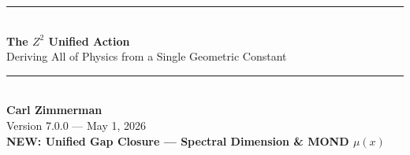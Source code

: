 \documentclass[11pt,a4paper]{article}
\theoremstyle{plain}
\theoremstyle{definition}
\theoremstyle{remark}
\begin{document}

\begin{center}
\rule{\textwidth}{1.5pt}\\[0.5cm]
{\LARGE\bfseries The $Z^2$ Unified Action}\\[0.3cm]
{\Large Deriving All of Physics from a Single Geometric Constant}\\[0.5cm]
\rule{\textwidth}{1.5pt}\\[0.8cm]

{\large\bfseries Carl Zimmerman}\\[0.3cm]
Version 7.0.0 --- May 1, 2026\\[0.3cm]
\textcolor{newcolor}{\textbf{NEW: Unified Gap Closure --- Spectral Dimension \& MOND $\mu(x)$}}
\end{center}

\vspace{1cm}

\end{document}
